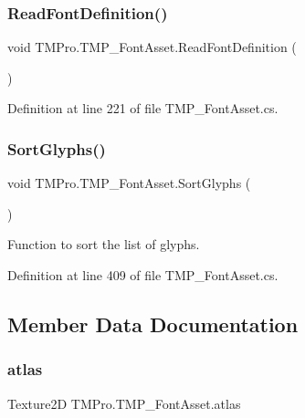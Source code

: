\subsubsection{\texorpdfstring{ReadFontDefinition()}{ReadFontDefinition()}}
{\footnotesize\ttfamily void T\+M\+Pro.\+T\+M\+P\+\_\+\+Font\+Asset.\+Read\+Font\+Definition (\begin{DoxyParamCaption}{ }\end{DoxyParamCaption})}







Definition at line 221 of file T\+M\+P\+\_\+\+Font\+Asset.\+cs.

\mbox{\label{class_t_m_pro_1_1_t_m_p___font_asset_a65d62154e56cd5bde1da7a8f9a183f5d}} 
\subsubsection{\texorpdfstring{SortGlyphs()}{SortGlyphs()}}
{\footnotesize\ttfamily void T\+M\+Pro.\+T\+M\+P\+\_\+\+Font\+Asset.\+Sort\+Glyphs (\begin{DoxyParamCaption}{ }\end{DoxyParamCaption})}



Function to sort the list of glyphs. 



Definition at line 409 of file T\+M\+P\+\_\+\+Font\+Asset.\+cs.



\subsection{Member Data Documentation}
\mbox{\label{class_t_m_pro_1_1_t_m_p___font_asset_a498534bae36d4dd9080e7ac93af657e0}} 
\subsubsection{\texorpdfstring{atlas}{atlas}}
{\footnotesize\ttfamily Texture2D T\+M\+Pro.\+T\+M\+P\+\_\+\+Font\+Asset.\+atlas}



